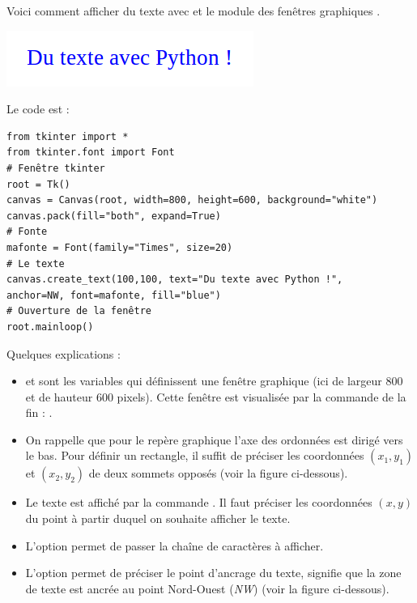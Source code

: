 \documentclass[11pt,class=report,crop=false]{standalone}
\begin{document}
\begin{cours}
Voici comment afficher du texte avec \Python{} et le module des fenêtres 
graphiques .


\begin{center}
\includegraphics[scale=0.6]{ecran-markdown-7}
\end{center}
Le code est :
\begin{lstlisting}
from tkinter import *
from tkinter.font import Font
# Fenêtre tkinter
root = Tk() 
canvas = Canvas(root, width=800, height=600, background="white")
canvas.pack(fill="both", expand=True)
# Fonte
mafonte = Font(family="Times", size=20)
# Le texte
canvas.create_text(100,100, text="Du texte avec Python !", 
anchor=NW, font=mafonte, fill="blue")
# Ouverture de la fenêtre
root.mainloop()
\end{lstlisting}



Quelques explications :
\begin{itemize}
  \item {} et  sont les variables qui définissent une fenêtre graphique (ici de largeur $800$ et de hauteur $600$ pixels). Cette fenêtre est visualisée par la commande de la fin : .
  
  \item On rappelle que pour le repère graphique l'axe des ordonnées est dirigé vers le bas. Pour définir un rectangle, il suffit de préciser les coordonnées 
  $(x_1,y_1)$ et $(x_2,y_2)$ de deux sommets opposés (voir la figure ci-dessous). 
  
  \item Le texte est affiché par la commande . Il faut préciser les coordonnées $(x,y)$ du point à partir duquel on souhaite afficher le texte. 
  
  \item L'option  permet de passer la chaîne de caractères à afficher.
  
  \item L'option  permet de préciser le point d'ancrage du texte,  signifie que la zone de texte est ancrée au point Nord-Ouest (\emph{NW}) (voir la figure ci-dessous).
  

\end{itemize}
\end{cours}
\end{document}
